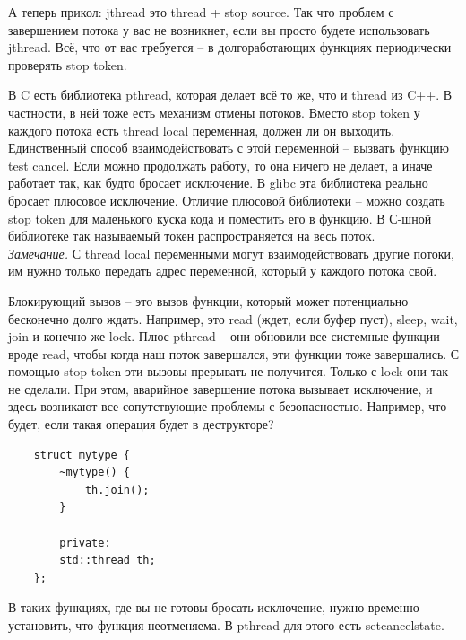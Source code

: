 \documentclass[12pt, a4paper]{article}
\begin{document}
А теперь прикол: jthread это thread + stop source. Так что проблем с завершением потока у вас не возникнет, если вы просто будете использовать jthread. Всё, что от вас требуется -- в долгоработающих функциях периодически проверять stop token.\\
\par В C есть библиотека pthread, которая делает всё то же, что и thread из C++. В частности, в ней тоже есть механизм отмены потоков. Вместо stop token у каждого потока есть thread local переменная, должен ли он выходить. Единственный способ взаимодействовать с этой переменной -- вызвать функцию test cancel. Если можно продолжать работу, то она ничего не делает, а иначе работает так, как будто бросает исключение. В glibc эта библиотека реально бросает плюсовое исключение. Отличие плюсовой библиотеки -- можно создать stop token для маленького куска кода и поместить его в функцию. В С-шной библиотеке так называемый токен распространяется на весь поток. \\
\textit{Замечание.} С thread local переменными могут взаимодействовать другие потоки, им нужно только передать адрес переменной, который у каждого потока свой.
\par Блокирующий вызов -- это вызов функции, который может потенциально бесконечно долго ждать. Например, это read (ждет, если буфер пуст), sleep, wait, join и конечно же lock. Плюс pthread -- они обновили все системные функции вроде read, чтобы когда наш поток завершался, эти функции тоже завершались. С помощью stop token эти вызовы прерывать не получится. Только с lock они так не сделали. При этом, аварийное завершение потока вызывает исключение, и здесь возникают все сопутствующие проблемы с безопасностью. Например, что будет, если такая операция будет в деструкторе?
\begin{verbatim}
	struct mytype {
		~mytype() {
			th.join();
		}
		
		private:
		std::thread th;
	};
\end{verbatim}
В таких функциях, где вы не готовы бросать исключение, нужно временно установить, что функция неотменяема. В pthread для этого есть setcancelstate.
\end{document}
